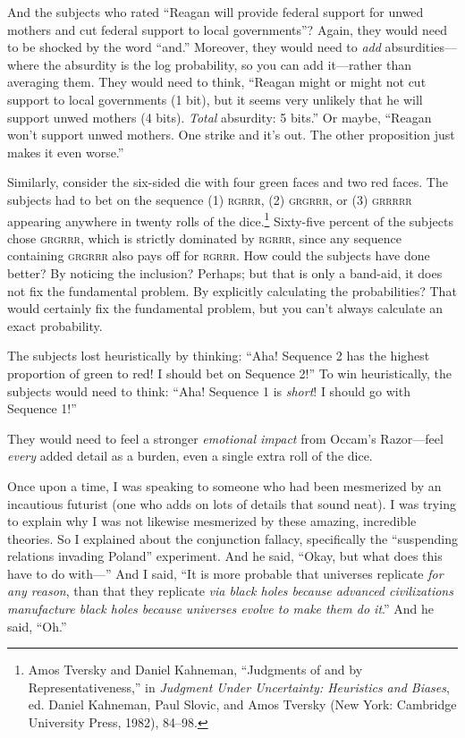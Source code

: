 {
 And the subjects who rated ``Reagan will provide
federal support for unwed mothers and cut federal support to local
governments''? Again, they would need to be shocked
by the word ``and.'' Moreover, they
would need to \textit{add} absurdities---where the absurdity is the log
probability, so you can add it---rather than averaging them. They would
need to think, ``Reagan might or might not cut support
to local governments (1 bit), but it seems very unlikely that he will
support unwed mothers (4 bits). \textit{Total} absurdity: 5
bits.'' Or maybe, ``Reagan
won't support unwed mothers. One strike and
it's out. The other proposition just makes it even
worse.''}

{
 Similarly, consider the six-sided die with four green faces and
two red faces. The subjects had to bet on the sequence (1) \textsc{rgrrr}, (2)
\textsc{grgrrr}, or (3) \textsc{grrrrr} appearing anywhere in twenty rolls of the
dice.\footnote{Amos Tversky and Daniel Kahneman, ``Judgments
of and by Representativeness,'' in \textit{Judgment
Under Uncertainty: Heuristics and Biases}, ed. Daniel Kahneman, Paul
Slovic, and Amos Tversky (New York: Cambridge University Press, 1982),
84--98.} Sixty-five percent of the subjects chose
\textsc{grgrrr}, which is strictly dominated by \textsc{rgrrr}, since any sequence
containing \textsc{grgrrr} also pays off for \textsc{rgrrr}. How could the subjects have
done better? By noticing the inclusion? Perhaps; but that is only a
band-aid, it does not fix the fundamental problem. By explicitly
calculating the probabilities? That would certainly fix the fundamental
problem, but you can't always calculate an exact
probability.}

{
 The subjects lost heuristically by thinking:
``Aha! Sequence 2 has the highest proportion of green
to red! I should bet on Sequence 2!'' To win
heuristically, the subjects would need to think:
``Aha! Sequence 1 is \textit{short}! I should go with
Sequence 1!''}

{
 They would need to feel a stronger \textit{emotional impact} from
Occam's Razor---feel \textit{every} added detail as a
burden, even a single extra roll of the dice.}

{
 Once upon a time, I was speaking to someone who had been
mesmerized by an incautious futurist (one who adds on lots of details
that sound neat). I was trying to explain why I was not likewise
mesmerized by these amazing, incredible theories. So I explained about
the conjunction fallacy, specifically the ``suspending
relations {\textpm} invading Poland'' experiment. And
he said, ``Okay, but what does this have to do
with---'' And I said, ``It is more
probable that universes replicate \textit{for any reason}, than that
they replicate \textit{via black holes because advanced civilizations
manufacture black holes because universes evolve to make them do
it}.'' And he said,
``Oh.''}


